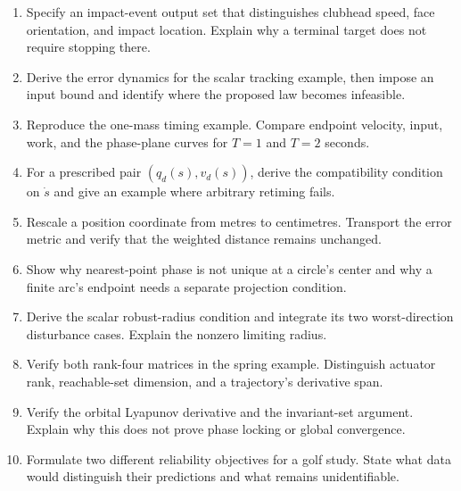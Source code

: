 \begin{enumerate}
\item Specify an impact-event output set that distinguishes clubhead speed,
      face orientation, and impact location. Explain why a terminal target
      does not require stopping there.
\item Derive the error dynamics for the scalar tracking example, then impose
      an input bound and identify where the proposed law becomes infeasible.
\item Reproduce the one-mass timing example. Compare endpoint velocity, input,
      work, and the phase-plane curves for $T=1$ and $T=2$ seconds.
\item For a prescribed pair $(q_d(s),v_d(s))$, derive the compatibility condition
      on $\dot s$ and give an example where arbitrary retiming fails.
\item Rescale a position coordinate from metres to centimetres. Transport the
      error metric and verify that the weighted distance remains unchanged.
\item Show why nearest-point phase is not unique at a circle's center and why
      a finite arc's endpoint needs a separate projection condition.
\item Derive the scalar robust-radius condition and integrate its two
      worst-direction disturbance cases. Explain the nonzero limiting radius.
\item Verify both rank-four matrices in the spring example. Distinguish
      actuator rank, reachable-set dimension, and a trajectory's derivative span.
\item Verify the orbital Lyapunov derivative and the invariant-set argument.
      Explain why this does not prove phase locking or global convergence.
\item Formulate two different reliability objectives for a golf study. State
      what data would distinguish their predictions and what remains unidentifiable.
\end{enumerate}

